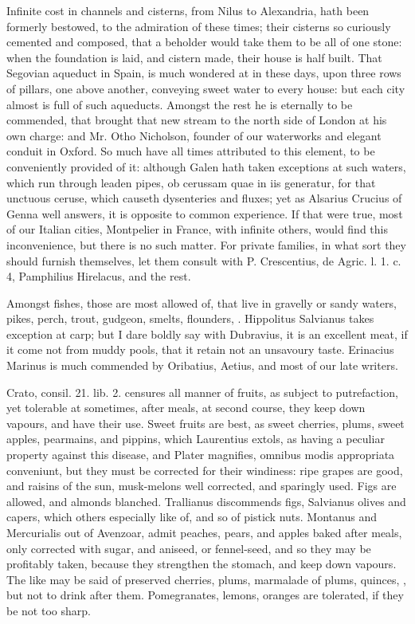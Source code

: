 {Infinite cost in channels and cisterns, from Nilus to Alexandria, hath
been formerly bestowed, to the admiration of these times; their
cisterns so curiously cemented and composed, that a beholder would take
them to be all of one stone: when the foundation is laid, and cistern
made, their house is half built. That Segovian aqueduct in Spain, is
much wondered at in these days, upon three rows of pillars, one
above another, conveying sweet water to every house: but each city
almost is full of such aqueducts. Amongst the rest he is
eternally to be commended, that brought that new stream to the north
side of London at his own charge: and Mr. Otho Nicholson, founder of
our waterworks and elegant conduit in Oxford. So much have all times
attributed to this element, to be conveniently provided of it: although
Galen hath taken exceptions at such waters, which run through leaden
pipes, ob cerussam quae in iis generatur, for that unctuous ceruse,
which causeth dysenteries and fluxes; yet as Alsarius Crucius of
Genna well answers, it is opposite to common experience. If that were
true, most of our Italian cities, Montpelier in France, with infinite
others, would find this inconvenience, but there is no such matter. For
private families, in what sort they should furnish themselves, let them
consult with P. Crescentius, de Agric. l. 1. c. 4, Pamphilius
Hirelacus, and the rest.

Amongst fishes, those are most allowed of, that live in gravelly or
sandy waters, pikes, perch, trout, gudgeon, smelts, flounders, \etc{}.
Hippolitus Salvianus takes exception at carp; but I dare boldly say
with  Dubravius, it is an excellent meat, if it come not from
muddy pools, that it retain not an unsavoury taste. Erinacius
Marinus is much commended by Oribatius, Aetius, and most of our late
writers.

Crato, consil. 21. lib. 2. censures all manner of fruits, as
subject to putrefaction, yet tolerable at sometimes, after meals, at
second course, they keep down vapours, and have their use. Sweet fruits
are best, as sweet cherries, plums, sweet apples, pearmains, and
pippins, which Laurentius extols, as having a peculiar property against
this disease, and Plater magnifies, omnibus modis appropriata
conveniunt, but they must be corrected for their windiness: ripe grapes
are good, and raisins of the sun, musk-melons well corrected, and
sparingly used. Figs are allowed, and almonds blanched. Trallianus
discommends figs, Salvianus olives and capers, which others
especially like of, and so of pistick nuts. Montanus and Mercurialis
out of Avenzoar, admit peaches, pears, and apples baked after
meals, only corrected with sugar, and aniseed, or fennel-seed, and so
they may be profitably taken, because they strengthen the stomach, and
keep down vapours. The like may be said of preserved cherries, plums,
marmalade of plums, quinces, \etc{}, but not to drink after them.
Pomegranates, lemons, oranges are tolerated, if they be not too
sharp.

}
